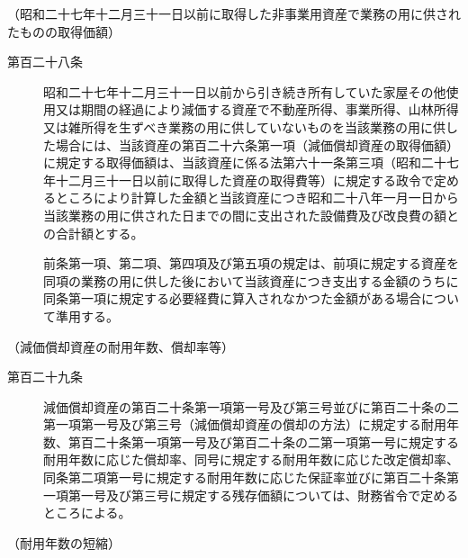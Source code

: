\documentclass[twocolumn,a4j,10pt]{ltjtarticle}
\begin{document}
\noindent\hspace{10pt}（昭和二十七年十二月三十一日以前に取得した非事業用資産で業務の用に供されたものの取得価額）
\begin{description}
\item[第百二十八条]昭和二十七年十二月三十一日以前から引き続き所有していた家屋その他使用又は期間の経過により減価する資産で不動産所得、事業所得、山林所得又は雑所得を生ずべき業務の用に供していないものを当該業務の用に供した場合には、当該資産の第百二十六条第一項（減価償却資産の取得価額）に規定する取得価額は、当該資産に係る法第六十一条第三項（昭和二十七年十二月三十一日以前に取得した資産の取得費等）に規定する政令で定めるところにより計算した金額と当該資産につき昭和二十八年一月一日から当該業務の用に供された日までの間に支出された設備費及び改良費の額との合計額とする。
\item[]前条第一項、第二項、第四項及び第五項の規定は、前項に規定する資産を同項の業務の用に供した後において当該資産につき支出する金額のうちに同条第一項に規定する必要経費に算入されなかつた金額がある場合について準用する。
\end{description}
\noindent\hspace{10pt}（減価償却資産の耐用年数、償却率等）
\begin{description}
\item[第百二十九条]減価償却資産の第百二十条第一項第一号及び第三号並びに第百二十条の二第一項第一号及び第三号（減価償却資産の償却の方法）に規定する耐用年数、第百二十条第一項第一号及び第百二十条の二第一項第一号に規定する耐用年数に応じた償却率、同号に規定する耐用年数に応じた改定償却率、同条第二項第一号に規定する耐用年数に応じた保証率並びに第百二十条第一項第一号及び第三号に規定する残存価額については、財務省令で定めるところによる。
\end{description}
\noindent\hspace{10pt}（耐用年数の短縮）
\end{document}
